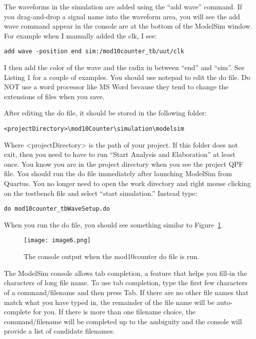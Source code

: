 The waveforms in the simulation are added using the ``add wave''
command. If you drag-and-drop a signal name into the waveform area, you
will see the add wave command appear in the console are at the bottom of
the ModelSim window. For example when I manually added the clk, I see:

\begin{verbatim}
add wave -position end sim:/mod10counter_tb/uut/clk
\end{verbatim}

I then add the color of the wave and the radix in between ``end'' and
``sim''. See Listing 1 for a couple of examples. You should use notepad
to edit the do file. Do NOT use a word processor like MS Word because
they tend to change the extensions of files when you save.

After editing the do file, it should be stored in the following folder:

\begin{verbatim}
<projectDirectory>\mod10Counter\simulation\modelsim
\end{verbatim}

Where \textless projectDirectory\textgreater{} is the path of your
project. If this folder does not exit, then you need to have to run
``Start Analysis and Elaboration'' at least once. You know you are in
the project directory when you see the project QPF file. You should run
the do file immediately after launching ModelSim from Quartus. You no
longer need to open the work directory and right mouse clicking on the
testbench file and select ``start simulation.'' Instead type:

\begin{verbatim}
do mod10counter_tbWaveSetup.do
\end{verbatim}

When you run the do file, you should see something similar to Figure~\ref{fig:mod10console}.

\begin{figure}
\texttt{[image: image6.png]}
\caption{The console output when the mod10counter do file is run.}
\label{fig:mod10console}
\end{figure}

The ModelSim console allows tab completion, a feature that helps you
fill-in the characters of long file name. To use tab completion, type
the first few characters of a command/filename and then press Tab. If
there are no other file names that match what you have typed in, the
remainder of the file name will be auto-complete for you. If there is
more than one filename choice, the command/filename will be completed up
to the ambiguity and the console will provide a list of candidate
filenames.

